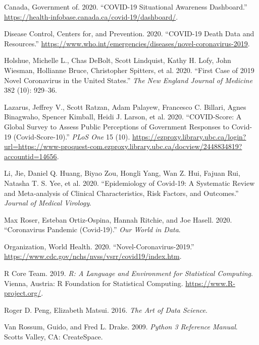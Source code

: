 \documentclass[
]{article}
\newlength{\cslhangindent}
\newenvironment{cslreferences}%
  {\setlength{\parindent}{0pt}%
  \everypar{\setlength{\hangindent}{\cslhangindent}}\ignorespaces}%
  {\par}
\begin{document}
\hypertarget{refs}{}
\begin{cslreferences}
\leavevmode\hypertarget{ref-govCA}{}%
Canada, Government of. 2020. ``COVID-19 Situational Awareness
Dashboard.''
\url{https://health-infobase.canada.ca/covid-19/dashboard/}.

\leavevmode\hypertarget{ref-cdc}{}%
Disease Control, Centers for, and Prevention. 2020. ``COVID-19 Death
Data and Resources.''
\url{https://www.who.int/emergencies/diseases/novel-coronavirus-2019}.

\leavevmode\hypertarget{ref-first-case}{}%
Holshue, Michelle L., Chas DeBolt, Scott Lindquist, Kathy H. Lofy, John
Wiesman, Hollianne Bruce, Christopher Spitters, et al. 2020. ``First
Case of 2019 Novel Coronavirus in the United States.'' \emph{The New
England Journal of Medicine} 382 (10): 929--36.

\leavevmode\hypertarget{ref-covid-score}{}%
Lazarus, Jeffrey V., Scott Ratzan, Adam Palayew, Francesco C. Billari,
Agnes Binagwaho, Spencer Kimball, Heidi J. Larson, et al. 2020.
``COVID-Score: A Global Survey to Assess Public Perceptions of
Government Responses to Covid-19 (Covid-Score-10).'' \emph{PLoS One} 15
(10).
\url{https://ezproxy.library.ubc.ca/login?url=https://www-proquest-com.ezproxy.library.ubc.ca/docview/2448834819?accountid=14656}.

\leavevmode\hypertarget{ref-epidemiology}{}%
Li, Jie, Daniel Q. Huang, Biyao Zou, Hongli Yang, Wan Z. Hui, Fajuan
Rui, Natasha T. S. Yee, et al. 2020. ``Epidemiology of Covid‐19: A
Systematic Review and Meta‐analysis of Clinical Characteristics, Risk
Factors, and Outcomes.'' \emph{Journal of Medical Virology}.

\leavevmode\hypertarget{ref-owidcoronavirus}{}%
Max Roser, Esteban Ortiz-Ospina, Hannah Ritchie, and Joe Hasell. 2020.
``Coronavirus Pandemic (Covid-19).'' \emph{Our World in Data}.

\leavevmode\hypertarget{ref-who}{}%
Organization, World Health. 2020. ``Novel-Coronavirus-2019.''
\url{https://www.cdc.gov/nchs/nvss/vsrr/covid19/index.htm}.

\leavevmode\hypertarget{ref-R}{}%
R Core Team. 2019. \emph{R: A Language and Environment for Statistical
Computing}. Vienna, Austria: R Foundation for Statistical Computing.
\url{https://www.R-project.org/}.

\leavevmode\hypertarget{ref-aods}{}%
Roger D. Peng, Elizabeth Matsui. 2016. \emph{The Art of Data Science}.

\leavevmode\hypertarget{ref-Python}{}%
Van Rossum, Guido, and Fred L. Drake. 2009. \emph{Python 3 Reference
Manual}. Scotts Valley, CA: CreateSpace.
\end{cslreferences}
\end{document}
